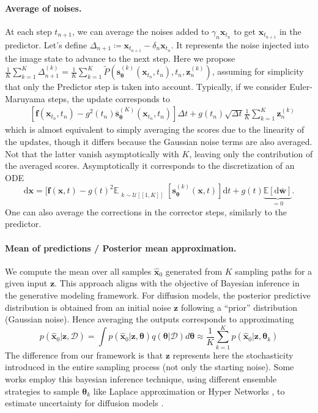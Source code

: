 \documentclass[10pt]{article} %
\newcommand{\engquote}[1]{``#1''}
\newcommand{\train}{\mathcal{D}}
\def\rvx{{\mathbf{x}}}
\def\rvz{{\mathbf{z}}}
\def\vtheta{{\bm{\theta}}}
\def\vs{{\bm{s}}}
\begin{document}
\paragraph{Average of noises.} At each step $t_{n+1}$, we can average the noises added to $\gamma_n \rvx_{t_n}$ to get $ \rvx_{t_{n+1}}$ in the predictor. Let's define $\Delta_{n+1} \coloneqq \rvx_{t_{n+1}} - \delta_n \rvx_{t_n}$. It represents the noise injected into the image state to advance to the next step. Here we propose 
$\frac{1}{K} \sum_{k=1}^K \Delta^{(k)}_{n+1} = \frac{1}{K} \sum_{k=1}^K \tilde{P}(\vs^{(k)}_\vtheta(\rvx_{t_n},t_n), t_n, \rvz^{(k)}_n)$,
assuming for simplicity that only the Predictor step is taken into account.
 Typically, if we consider Euler-Maruyama steps, the update corresponds to
\begin{align}
& \left[\mathbf{f}(\rvx_{t_{n}},t_{n}) - g^2(t_n) \overline{\vs}^{(K)}_\vtheta(\rvx_{t_n}, t_n)\right] \Delta t +  g(t_n) \sqrt{\Delta t} \frac{1}{K} \sum_{k=1}^K \rvz^{(k)}_n
\end{align}
which is almost equivalent to simply averaging the scores due to the linearity of the updates, though it differs because the Gaussian noise terms are also averaged. Not that the latter vanish asymptotically with $K$, leaving only the contribution of the averaged scores. Asymptotically it corresponds to the discretization of an ODE
\begin{equation}
\mathrm{d}\rvx = [\mathbf{f}(\rvx,t) - g(t)^2 \mathbb{E}_{\substack{k \sim \mathcal{U}[\![1,K]\!]}}[\vs^{(k)}_\vtheta(\rvx,t)]\mathrm{d}t + g(t)\underbrace{\mathbb{E}[\mathrm{d}\bar{\mathbf{w}}]}_{=0}.
\end{equation}
 One can also average the corrections in the corrector steps, similarly to the predictor. 


\paragraph{Mean of predictions / Posterior mean approximation.} We compute the mean over all samples $\widehat{\rvx}_0$ generated from $K$ sampling paths for a given input $\rvz$. This approach aligns with the objective of Bayesian inference in the generative modeling framework.  For diffusion models, the posterior predictive distribution is obtained from an initial noise $\rvz$ following a \engquote{prior} distribution (Gaussian noise). Hence averaging the outputs corresponds to approximating \begin{equation}\label{eq: average of predictions generative} p(\widehat{\rvx}_0|\rvz,\train) = \int p(\widehat{\rvx}_0 | \rvz, \vtheta)q(\vtheta|\train)d\vtheta \approx \frac{1}{K} \sum_{k=1}^K p(\widehat{\rvx}_0 | \rvz, \vtheta_k)
\end{equation}
The difference from our framework is that $\rvz$ represents here the stochasticity introduced in the entire sampling process (not only the starting noise). Some works employ this bayesian inference technique, using different ensemble strategies to sample $\vtheta_k$ like Laplace approximation \citep{ritter2018scalable} or Hyper Networks \citep{ha2016hypernetworks}, to estimate uncertainty for diffusion models \citet{chan2024hyper, jazbec2025generative}.
\end{document}

